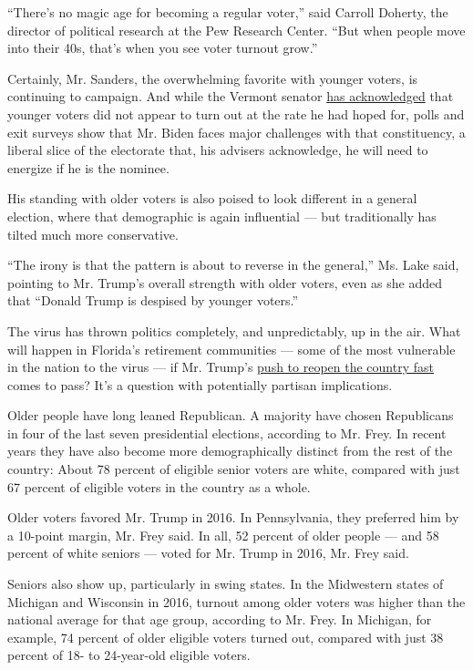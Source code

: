 ``There's no magic age for becoming a regular voter,'' said Carroll
Doherty, the director of political research at the Pew Research Center.
``But when people move into their 40s, that's when you see voter turnout
grow.''

Certainly, Mr. Sanders, the overwhelming favorite with younger voters,
is continuing to campaign. And while the Vermont senator
\href{https://www.nytimes3xbfgragh.onion/2020/03/04/us/politics/bernie-sanders-young-voter-turnout.html}{has
acknowledged} that younger voters did not appear to turn out at the rate
he had hoped for, polls and exit surveys show that Mr. Biden faces major
challenges with that constituency, a liberal slice of the electorate
that, his advisers acknowledge, he will need to energize if he is the
nominee.

His standing with older voters is also poised to look different in a
general election, where that demographic is again influential --- but
traditionally has tilted much more conservative.

``The irony is that the pattern is about to reverse in the general,''
Ms. Lake said, pointing to Mr. Trump's overall strength with older
voters, even as she added that ``Donald Trump is despised by younger
voters.''

The virus has thrown politics completely, and unpredictably, up in the
air. What will happen in Florida's retirement communities --- some of
the most vulnerable in the nation to the virus --- if Mr. Trump's
\href{https://www.nytimes3xbfgragh.onion/2020/03/23/business/trump-coronavirus-economy.html}{push
to reopen the country fast} comes to pass? It's a question with
potentially partisan implications.

Older people have long leaned Republican. A majority have chosen
Republicans in four of the last seven presidential elections, according
to Mr. Frey. In recent years they have also become more demographically
distinct from the rest of the country: About 78 percent of eligible
senior voters are white, compared with just 67 percent of eligible
voters in the country as a whole.

Older voters favored Mr. Trump in 2016. In Pennsylvania, they preferred
him by a 10-point margin, Mr. Frey said. In all, 52 percent of older
people --- and 58 percent of white seniors --- voted for Mr. Trump in
2016, Mr. Frey said.

Seniors also show up, particularly in swing states. In the Midwestern
states of Michigan and Wisconsin in 2016, turnout among older voters was
higher than the national average for that age group, according to Mr.
Frey. In Michigan, for example, 74 percent of older eligible voters
turned out, compared with just 38 percent of 18- to 24-year-old eligible
voters.


